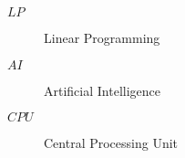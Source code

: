 \begin{description}
    \item[$LP$] Linear Programming
    \item[$AI$] Artificial Intelligence
    \item[$CPU$] Central Processing Unit
\end{description}
